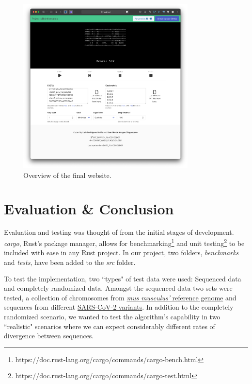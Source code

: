 \documentclass[twoside,openright,titlepage,numbers=noenddot,headinclude,%
                footinclude=true,cleardoublepage=empty,abstractoff, %
                BCOR=5mm,paper=a4,fontsize=11pt,%
                ngerman,american,%
                ]{scrreprt}
\begin{document}
\begin{figure}[h]
    \includegraphics[width=0.8\textwidth]{report/webapp.png}
    \centering
    \caption{Overview of the final website.}
    \label{fig:webapp}
\end{figure}

\chapter{Evaluation \& Conclusion}
\label{cha:evaluation}

Evaluation and testing was thought of from the initial stages of development. \textit{cargo}, Rust's package manager, allows for benchmarking\footnote{https://doc.rust-lang.org/cargo/commands/cargo-bench.html} and unit testing\footnote{https://doc.rust-lang.org/cargo/commands/cargo-test.html} to be included with ease in any Rust project. In our project, two folders, \textit{benchmarks} and \textit{tests}, have been added to the \textit{src} folder.

To test the implementation, two ``types" of test data were used: Sequenced data and completely randomized data. Amongst the sequenced data two sets were tested, a collection of chromosomes from \href{https://www.ncbi.nlm.nih.gov/assembly/GCF_000001635.27/}{\textit{mus musculus'} reference genome} and sequences from different \href{https://viralzone.expasy.org/9556}{SARS-CoV-2 variants}. In addition to the completely randomized scenario, we wanted to test the algorithm's capability in two ``realistic" scenarios where we can expect considerably different rates of divergence between sequences.
\end{document}
